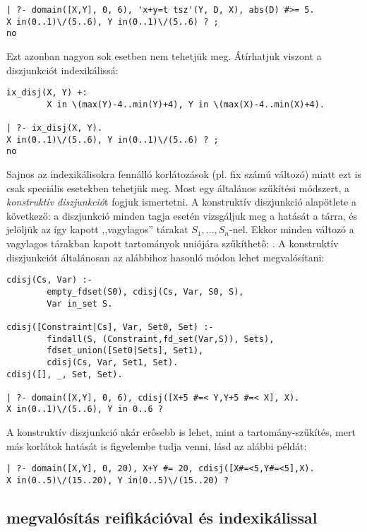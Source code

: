 \begin{verbatim}
| ?- domain([X,Y], 0, 6), 'x+y=t tsz'(Y, D, X), abs(D) #>= 5.
X in(0..1)\/(5..6), Y in(0..1)\/(5..6) ? ;
no
\end{verbatim}

Ezt azonban nagyon sok esetben nem tehetjük meg. Átírhatjuk viszont a diszjunkciót
indexikálissá:

\begin{verbatim}
ix_disj(X, Y) +: 
        X in \(max(Y)-4..min(Y)+4), Y in \(max(X)-4..min(X)+4).

| ?- ix_disj(X, Y).
X in(0..1)\/(5..6), Y in(0..1)\/(5..6) ? ;
no
\end{verbatim}

Sajnos az indexikálisokra fennálló korlátozások (pl. fix számú változó) miatt ezt
is csak speciális esetekben tehetjük meg. Most egy általános szűkítési módszert,
a \emph{konstruktív diszjunkció}t fogjuk ismertetni.
\br
A konstruktív diszjunkció alapötlete a következő: a diszjunkció minden tagja esetén
vizsgáljuk meg a hatását a tárra, és jelöljük az így kapott ,,vagylagos'' tárakat
$S_1, \ldots, S_n$-nel. Ekkor minden változó a vagylagos tárakban kapott tartományok
uniójára szűkíthető: . A konstruktív diszjunkciót
általánosan az alábbihoz hasonló módon lehet megvalósítani:

\begin{verbatim}
cdisj(Cs, Var) :-
        empty_fdset(S0), cdisj(Cs, Var, S0, S), 
        Var in_set S.

cdisj([Constraint|Cs], Var, Set0, Set) :-
        findall(S, (Constraint,fd_set(Var,S)), Sets),
        fdset_union([Set0|Sets], Set1),
        cdisj(Cs, Var, Set1, Set).
cdisj([], _, Set, Set).

| ?- domain([X,Y], 0, 6), cdisj([X+5 #=< Y,Y+5 #=< X], X).
X in(0..1)\/(5..6), Y in 0..6 ? 
\end{verbatim}

A konstruktív diszjunkció akár erősebb is lehet, mint a tartomány-szűkítés, mert más
korlátok hatását is figyelembe tudja venni, lásd az alábbi példát:

\begin{verbatim}
| ?- domain([X,Y], 0, 20), X+Y #= 20, cdisj([X#=<5,Y#=<5],X).
X in(0..5)\/(15..20), Y in(0..5)\/(15..20) ? 
\end{verbatim}

\subsection{\clpfd megvalósítás reifikációval és indexikálissal}

